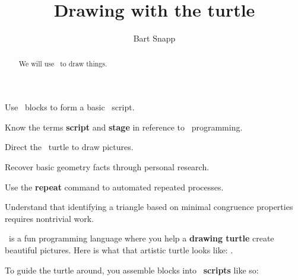 \documentclass[handout,noauthor,nooutcomes]{ximera}
\title{Drawing with the turtle}
\author{Bart Snapp}
\begin{document}
\begin{abstract}
  We will use \snap\ to draw things.
\end{abstract}
\maketitle

\begin{listOutcomes}
\item{Use \snap\ blocks to form a basic \snap\ script.}
\item{Know the terms \textbf{script} and \textbf{stage} in reference to \snap\ programming.}
\item{Direct the \snap\ turtle to draw pictures.}
\item{Recover basic geometry facts through personal research.}
\item{Use the \textbf{repeat} command to automated repeated processes.}
\item{Understand that identifying a triangle based on minimal congruence properties requires nontrivial work.}
\end{listOutcomes}

\snap\ is a fun programming language where you help a \textbf{drawing
  turtle} create beautiful pictures.  Here is what that artistic
turtle looks like:
.


To guide the turtle around, you assemble blocks into
\snap\ \textbf{scripts} like so:

\mynewpage
\end{document}
